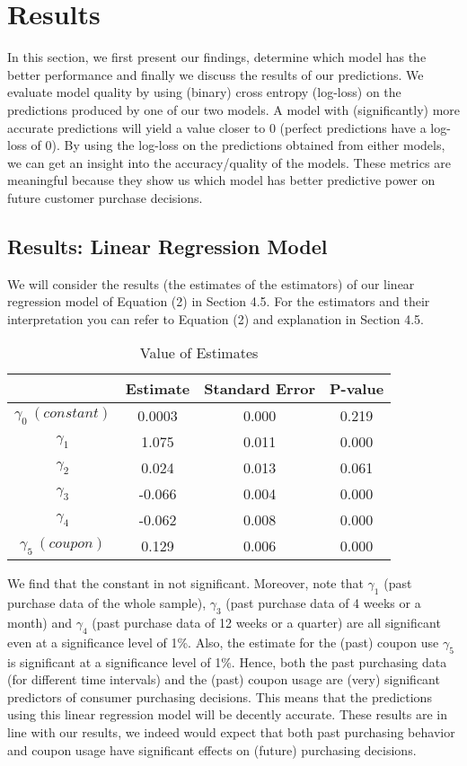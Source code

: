\section{Results}
In this section, we first present our findings, determine which model has the
better performance and finally we discuss the results of our predictions. We
evaluate model quality by using (binary) cross entropy (log-loss) on the
predictions produced by one of our two models. A model with 
(significantly) more accurate predictions will yield a value closer to 0
(perfect predictions have a log-loss of 0). By using the log-loss on the
predictions obtained from either models, we can get an insight into the
accuracy/quality of the models. These metrics are meaningful because they show us which
model has better predictive power on future customer purchase decisions.

\subsection{Results: Linear Regression Model}
We will consider the results (the estimates of the estimators) of our linear
regression model of Equation (2) in Section 4.5. For the estimators and their
interpretation you can refer to Equation (2) and explanation in Section 4.5.

\begin{table}[H]
    \centering
    \begin{tabular}{| c | c | c | c |}
        \hline
        & Estimate & Standard Error & P-value \\
        \hline
        $\gamma_{0}\ (constant)$ & 0.0003 & 0.000 & 0.219 \\
        $\gamma_{1}$ & 1.075 & 0.011 & 0.000 \\
        $\gamma_{2}$ & 0.024 & 0.013 & 0.061 \\
        $\gamma_{3}$ & -0.066 & 0.004 & 0.000 \\
        $\gamma_{4}$ & -0.062 & 0.008 & 0.000 \\
        $\gamma_{5}\ (coupon)$ & 0.129 & 0.006 & 0.000 \\
        \hline
    \end{tabular}
    \caption{Value of Estimates}
\end{table}

We find that the constant in not significant. Moreover, note that $\gamma_{1}$
(past purchase data of the whole sample), $\gamma_{3}$ (past purchase data of 4
weeks or a month) and $\gamma_{4}$ (past purchase data of 12 weeks or a quarter)
are all significant even at a significance level of 1\%. Also, the estimate for
the (past) coupon use $\gamma_{5}$ is significant at a significance level of
1\%. Hence, both the past purchasing data (for different time intervals) and the
(past) coupon usage are (very) significant predictors of consumer purchasing
decisions. This means that the predictions using this linear regression model
will be decently accurate. These results are in line with our results, we indeed
would expect that both past purchasing behavior and coupon usage have
significant effects on (future) purchasing decisions.

